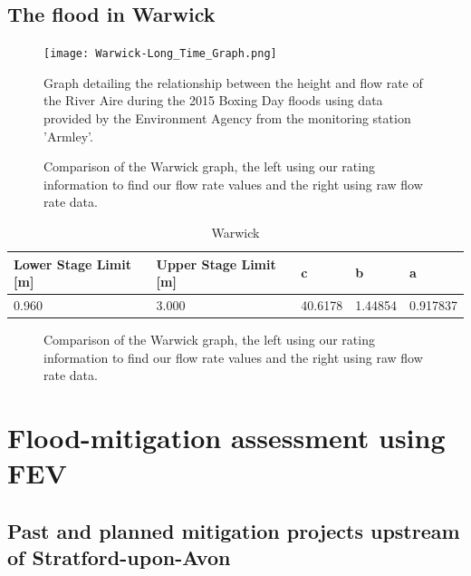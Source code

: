 \documentclass[11pt,a4paper]{article}
\begin{document}
\subsection{The flood in Warwick}
\begin{figure}[H]
\begin{center}
\texttt{[image: Warwick-Long\_Time\_Graph.png]}
\caption{Graph detailing the relationship between the height and flow rate of the River Aire during the 2015 Boxing Day floods using data provided by the Environment Agency from the monitoring station 'Armley'.}
\end{center}
\end{figure}

\begin{figure}[H]
\centering
{}
\hfill
{}
\caption{Comparison of the Warwick graph, the left using our rating information to find our flow rate values and the right using raw flow rate data.}
\end{figure}

\begin{table}[H]
\centering
\begin{tabular}{|l|l|l|l|l|}
\hline
Lower Stage Limit {[}m{]} & Upper Stage Limit {[}m{]} & c & b & a \\
\hline
0.960 & 3.000 & 40.6178 & 1.44854 & 0.917837 \\
\hline
\end{tabular}
\caption{Warwick}
\end{table}
\begin{figure}[H]
\centering
{}
\hfill
{}
\caption{Comparison of the Warwick graph, the left using our rating information to find our flow rate values and the right using raw flow rate data.}
\end{figure}

\section{Flood-mitigation assessment using FEV}
\subsection{Past and planned mitigation projects upstream of Stratford-upon-Avon}
\end{document}
